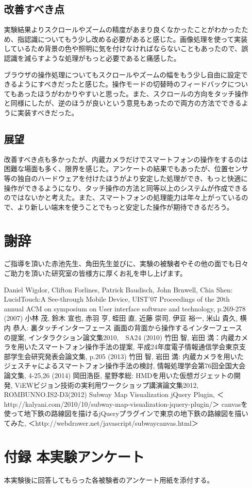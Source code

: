 \documentclass[11pt,a4j, titlepage]{jarticle} %
\begin{document}
\subsection{改善すべき点}
実験結果よりスクロールやズームの精度があまり良くなかったことがわかったため、指認識についてもう少し改める必要があると感じた。画像処理を使って実装しているため背景の色や照明に気を付けなければならないこともあったので、誤認識を減らすような処理がもっと必要であると痛感した。

ブラウザの操作処理についてもスクロールやズームの幅をもう少し自由に設定できるようにすべきだったと感じた。操作モードの切替時のフィードバックについてもあったほうがわかりやすいと思った。また、スクロールの方向をタッチ操作と同様にしたが、逆のほうが良いという意見もあったので両方の方法でできるように実装すべきだった。

\subsection{展望}
改善すべき点も多かったが、内蔵カメラだけでスマートフォンの操作をするのは困難な場面も多く、限界を感じた。アンケートの結果でもあったが、位置センサ等の独自のハードウェアを付けたほうがより安定した処理ができ、もっと快適に操作ができるようになり、タッチ操作の方法と同等以上のシステムが作成できるのではないかと考えた。また、スマートフォンの処理能力は年々上がっているので、より新しい端末を使うことでもっと安定した操作が期待できるだろう。

\section*{謝辞}
ご指導を頂いた赤池先生、角田先生並びに、実験の被験者やその他の面でも日々ご助力を頂いた研究室の皆様方に厚くお礼を申し上げます。

\newpage
\begin{thebibliography}{数字}
   Daniel Wigdor, Clifton Forlines, Patrick Baudisch, John Brnwell, Chia Shen: LucidTouch:A See-through Mobile Device, UIST’07 Proceedings of the 20th annual ACM on symposium on User interface software and technology, p.269-278 (2007)
   小林 茂, 鈴木 宣也, 赤羽 亨, 蛭田 直, 近藤 崇司, 伊豆 裕一, 米山 貴久, 横内 恭人: 裏タッチインターフェース 画面の背面から操作するインターフェースの提案, インタラクション論文集2010,　SA24 (2010)
   竹田 智, 岩田 満：内蔵カメラを用いたスマートフォン操作手法の提案, 平成24年度電子情報通信学会東京支部学生会研究発表会論文集, p.205 (2013)
   竹田 智, 岩田 満: 内蔵カメラを用いたジェスチャによるスマートフォン操作手法の検討, 情報処理学会第76回全国大会論文集, 4-25,26 (2014)
   岡田浩臣, 星野孝総: HMDを用いた仮想ガジェットの開発, ViEWビジョン技術の実利用ワークショップ講演論文集2012, ROMBUNNO.IS2-D3(2012)
   Subway Map Visualization jQuery Plugin, ＜http://kalyani.com/2010/10/subway-map-visualization-jquery-plugin/＞
   canvasを使って地下鉄の路線図を描けるjQueryプラグインで東京の地下鉄の路線図を描いてみた, ＜http://webdrawer.net/javascript/subwaycanvas.html＞
\end{thebibliography}

\newpage
\section*{付録 本実験アンケート}
本実験後に回答してもらった各被験者のアンケート用紙を添付する。
\end{document}
